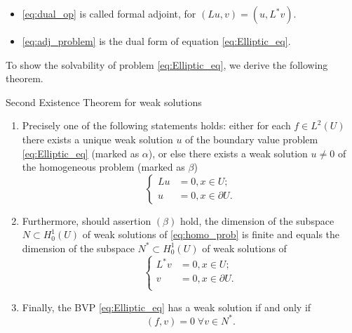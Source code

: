 \begin{remark}
    \begin{itemize}
        \item \eqref{eq:dual_op} is called formal adjoint, for $(Lu,v)=(u,L^{*}v)$.
        \item \eqref{eq:adj_problem} is the dual form of equation \eqref{eq:Elliptic_eq}.
    \end{itemize}
\end{remark}
To show the solvability of problem \eqref{eq:Elliptic_eq}, we derive the following theorem.
\begin{theorem}{Second Existence Theorem for weak solutions}
    \label{thm:2nd_exist}
    \begin{enumerate}
        \item Precisely one of the following statements holds: either for each $f\in L^{2}(U)$ there exists a unique weak solution $u$ of the boundary value problem \eqref{eq:Elliptic_eq} (marked as $\alpha$), or else there exists a weak solution $u\neq 0$ of the homogeneous problem (marked as $\beta$) 
        \begin{equation}
            \label{eq:homo_prob}
            \left\{
                \begin{aligned}
                    Lu&=0,x\in U;\\
                    u&=0,x\in \partial U.
                \end{aligned}
            \right.
        \end{equation}
        \item Furthermore, should assertion $(\beta)$ hold, the dimension of the subspace $N\subset H_{0}^{1}(U)$ of weak solutions of \eqref{eq:homo_prob} is finite and equals the dimension of the subspace $N^{*}\subset H_{0}^{1}(U)$ of weak solutions of 
        \begin{equation}
            \label{eq:homo_dual}
            \left\{
                \begin{aligned}
                    L^{*}v&=0,x\in U;\\
                    v&=0,x\in\partial U.\\
                \end{aligned}
            \right.
        \end{equation}
        \item Finally, the BVP \eqref{eq:Elliptic_eq} has a weak solution if and only if 
        \begin{equation}
            (f,v)=0\;\forall v\in N^{*}.
        \end{equation}
    \end{enumerate}
\end{theorem}

